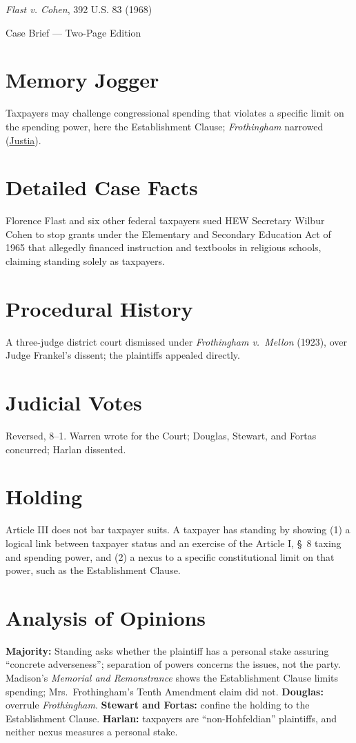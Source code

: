 \documentclass[12pt]{article}
\begin{document}
\begin{center}
{\LARGE \textit{Flast v. Cohen}, 392 U.S. 83 (1968)\par}
\vspace{0.5em}
{\large Case Brief --- Two-Page Edition\par}
\end{center}

\section{Memory Jogger}
Taxpayers may challenge congressional spending that violates a specific limit on the spending power, here the Establishment Clause; \textit{Frothingham} narrowed (\href{https://supreme.justia.com/cases/federal/us/392/83/}{Justia}).

\section{Detailed Case Facts}
Florence Flast and six other federal taxpayers sued HEW Secretary Wilbur Cohen to stop grants under the Elementary and Secondary Education Act of 1965 that allegedly financed instruction and textbooks in religious schools, claiming standing solely as taxpayers.

\section{Procedural History}
A three-judge district court dismissed under \textit{Frothingham v.\ Mellon} (1923), over Judge Frankel's dissent; the plaintiffs appealed directly.

\section{Judicial Votes}
Reversed, 8--1. Warren wrote for the Court; Douglas, Stewart, and Fortas concurred; Harlan dissented.

\section{Holding}
Article III does not bar taxpayer suits. A taxpayer has standing by showing (1) a logical link between taxpayer status and an exercise of the Article I, \S\ 8 taxing and spending power, and (2) a nexus to a specific constitutional limit on that power, such as the Establishment Clause.

\section{Analysis of Opinions}
\textbf{Majority:} Standing asks whether the plaintiff has a personal stake assuring ``concrete adverseness''; separation of powers concerns the issues, not the party. Madison's \textit{Memorial and Remonstrance} shows the Establishment Clause limits spending; Mrs.\ Frothingham's Tenth Amendment claim did not. \textbf{Douglas:} overrule \textit{Frothingham}. \textbf{Stewart and Fortas:} confine the holding to the Establishment Clause. \textbf{Harlan:} taxpayers are ``non-Hohfeldian'' plaintiffs, and neither nexus measures a personal stake.
\end{document}
